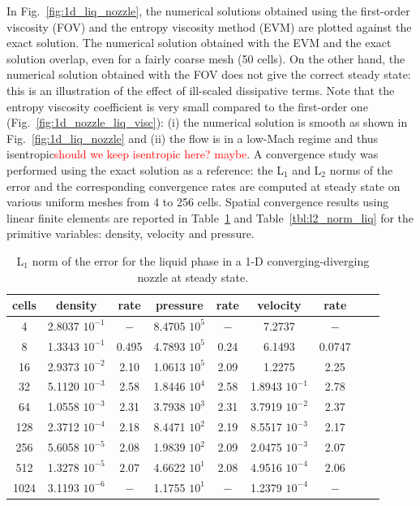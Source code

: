 \documentclass[preprint,10pt]{elsarticle}
\newcommand{\fig}[1]{Fig.~\ref{#1}}                      %
\newcommand{\tbl}[1]{Table~\ref{#1}}                     %
\newcommand{\tcr}[1]{\textcolor{red}{#1}}
\begin{document}
%
In \fig{fig:1d_liq_nozzle}, the numerical solutions obtained using the first-order viscosity (FOV) and the entropy 
viscosity method (EVM) are plotted against the exact solution. The numerical solution obtained with the EVM and the 
exact solution overlap, even for a fairly coarse mesh (50 cells).
On the other hand, the numerical solution obtained with the FOV does not give the correct steady state: this is an 
illustration of the effect of ill-scaled dissipative terms. 
%
Note that the entropy viscosity coefficient is very small compared to the first-order one (\fig{fig:1d_nozzle_liq_visc}): 
(i) the numerical solution is smooth as shown in \fig{fig:1d_liq_nozzle} and (ii) the flow is in a low-Mach regime and thus 
isentropic\tcr{should we keep isentropic here? maybe}. A convergence study was performed using the exact solution as a reference: the L$_1$ and L$_2$ norms of the 
error and the corresponding convergence rates are computed at steady state on various uniform meshes from 4 to 256 cells.
Spatial convergence results using linear finite elements are reported in \tbl{tbl:l1_norm_liq} and \tbl{tbl:l2_norm_liq} 
for the primitive variables: density, velocity and pressure.
%
\begin{table}[H]
\begin{center}
 \caption{\label{tbl:l1_norm_liq} L$_1$ norm of the error for the liquid phase in a 1-D converging-diverging nozzle at steady state.}
 \begin{tabular}{|c|c|c|c|c|c|c|c|c|}
 \hline
cells & density         & rate   & pressure        & rate    & velocity         & rate     \\ \hline
4    & 2.8037 $10^{-1}$ & $-$    & 8.4705 $10^{5}$ & $-$     & 7.2737           & $-$      \\ \hline
8    & 1.3343 $10^{-1}$ & 0.495 & 4.7893 $10^{5}$ & 0.24 & 6.1493           & 0.0747 \\ \hline
16   & 2.9373 $10^{-2}$ & 2.10 & 1.0613 $10^{5}$ & 2.09  & 1.2275           & 2.25   \\ \hline
32   & 5.1120 $10^{-3}$ & 2.58 & 1.8446 $10^{4}$ & 2.58  & 1.8943 $10^{-1}$ & 2.78   \\ \hline
64   & 1.0558 $10^{-3}$ & 2.31 & 3.7938 $10^{3}$ & 2.31  & 3.7919 $10^{-2}$ & 2.37   \\ \hline
128  & 2.3712 $10^{-4}$ & 2.18 & 8.4471 $10^{2}$ & 2.19  & 8.5517 $10^{-3}$ & 2.17   \\ \hline
256  & 5.6058 $10^{-5}$ & 2.08 & 1.9839 $10^{2}$ & 2.09  & 2.0475 $10^{-3}$ & 2.07   \\ \hline
512  & 1.3278 $10^{-5}$ & $2.07$ & 4.6622 $10^{1}$ & 2.08  & 4.9516 $10^{-4}$ & $2.06$   \\ \hline
1024  & 3.1193 $10^{-6}$ & $-$ & 1.1755 $10^{1}$ & $-$  & 1.2379 $10^{-4}$ & $-$   \\ \hline
\end{tabular}
\end{center}
\end{table}
\end{document}
